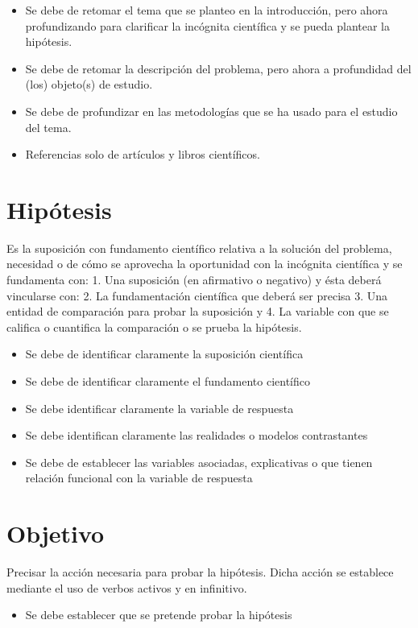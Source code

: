     \begin{itemize}
        \item Se debe de retomar el tema que se planteo en la introducción, pero ahora profundizando para clarificar la incógnita científica y se pueda plantear la hipótesis.
        \item Se debe de retomar la descripción del problema, pero ahora a profundidad del (los) objeto(s) de estudio. 
        \item Se debe de profundizar en las metodologías que se ha usado para el estudio del tema.
        \item Referencias solo de artículos y libros científicos.
    \end{itemize}
    \section{Hipótesis}
    
    Es la suposición con fundamento científico relativa a la solución del problema, necesidad o de cómo se aprovecha la oportunidad con la incógnita científica y se fundamenta con: 1. Una suposición (en afirmativo o negativo) y ésta deberá vincularse con:
    2. La fundamentación científica que deberá ser precisa 3. Una entidad de comparación para probar la suposición y
    4. La variable con que se califica o cuantifica la comparación o se prueba la hipótesis.
    
    \begin{itemize}
        \item Se debe de identificar claramente la suposición científica
        \item Se debe de identificar claramente el fundamento científico
        \item Se debe identificar claramente la variable de respuesta
        \item Se debe identifican claramente las realidades o modelos contrastantes
        \item Se debe de establecer las variables asociadas, explicativas o que tienen relación funcional con la variable de respuesta
    \end{itemize}
    \section{Objetivo}
    
    Precisar la acción necesaria para probar la hipótesis. Dicha acción se establece mediante el uso de verbos activos y en infinitivo.
    \begin{itemize}
        \item Se debe establecer que se pretende probar la hipótesis
    \end{itemize}
    
